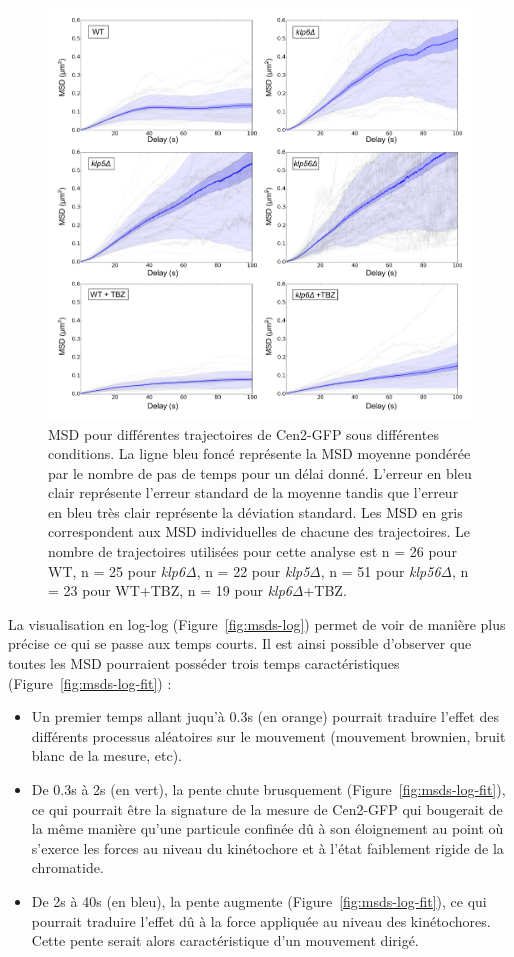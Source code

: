 \documentclass[12pt,a4paper,twoside,openright]{book}
\begin{document}
\begin{figure}[htbp]
\centering
\includegraphics{figures/results/imaging/msds.png}
\caption{\label{fig:msds}MSD pour différentes trajectoires de Cen2-GFP
sous différentes conditions. La ligne bleu foncé représente la MSD
moyenne pondérée par le nombre de pas de temps pour un délai donné.
L'erreur en bleu clair représente l'erreur standard de la moyenne tandis
que l'erreur en bleu très clair représente la déviation standard. Les
MSD en gris correspondent aux MSD individuelles de chacune des
trajectoires. Le nombre de trajectoires utilisées pour cette analyse est
n = 26 pour WT, n = 25 pour \emph{klp6Δ}, n = 22 pour \emph{klp5Δ}, n =
51 pour \emph{klp56Δ}, n = 23 pour WT+TBZ, n = 19 pour
\emph{klp6Δ}+TBZ.}
\end{figure}

La visualisation en log-log (Figure~\ref{fig:msds-log}) permet de voir
de manière plus précise ce qui se passe aux temps courts. Il est ainsi
possible d'observer que toutes les MSD pourraient posséder trois temps
caractéristiques (Figure~\ref{fig:msds-log-fit}) :

\begin{itemize}
\item
  Un premier temps allant juqu'à 0.3s (en orange) pourrait traduire
  l'effet des différents processus aléatoires sur le mouvement
  (mouvement brownien, bruit blanc de la mesure, etc).
\item
  De 0.3s à 2s (en vert), la pente chute brusquement
  (Figure~\ref{fig:msds-log-fit}), ce qui pourrait être la signature de
  la mesure de Cen2-GFP qui bougerait de la même manière qu'une
  particule confinée dû à son éloignement au point où s'exerce les
  forces au niveau du kinétochore et à l'état faiblement rigide de la
  chromatide.
\item
  De 2s à 40s (en bleu), la pente augmente
  (Figure~\ref{fig:msds-log-fit}), ce qui pourrait traduire l'effet dû à
  la force appliquée au niveau des kinétochores. Cette pente serait
  alors caractéristique d'un mouvement dirigé.
\end{itemize}
\end{document}
